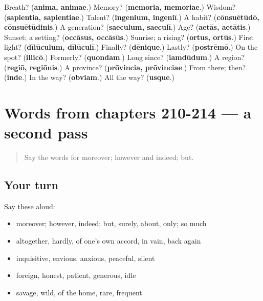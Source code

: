 \begin{tcolorbox}[breakable,colback=teal!4,colframe=teal!35!black,title={Before you move on}]
Breath? (\textbf{anima, animae}.) Memory? (\textbf{memoria, memoriae}.) Wisdom? (\textbf{sapientia, sapientiae}.) Talent? (\textbf{ingenium, ingeniī}.) A habit? (\textbf{cōnsuētūdō, cōnsuētūdinis}.) A generation? (\textbf{saeculum, saeculī}.) Age? (\textbf{aetās, aetātis}.) Sunset; a setting? (\textbf{occāsus, occāsūs}.) Sunrise; a rising? (\textbf{ortus, ortūs}.) First light? (\textbf{dīlūculum, dīlūculī}.) Finally? (\textbf{dēnique}.) Lastly? (\textbf{postrēmō}.) On the spot? (\textbf{illicō}.) Formerly? (\textbf{quondam}.) Long since? (\textbf{iamdūdum}.) A region? (\textbf{regiō, regiōnis}.) A province? (\textbf{prōvincia, prōvinciae}.) From there; then? (\textbf{inde}.) In the way? (\textbf{obviam}.) All the way? (\textbf{usque}.)
\end{tcolorbox}
\section[(dialogue)]{Words from chapters 210-214 — a second pass}

\label{lesson:LA-R214-second-pass-words-from-chapters-210-214}



\begin{quote}
Say the words for moreover; however and indeed; but.
\end{quote}

\subsection*{Your turn}
Say these aloud:

\begin{itemize}
\raggedright
  \item moreover; however, indeed; but, surely, about, only; so much
  \item altogether, hardly, of one's own accord, in vain, back again
  \item inquisitive, envious, anxious, peaceful, silent
  \item foreign, honest, patient, generous, idle
  \item savage, wild, of the home, rare, frequent
\end{itemize}

